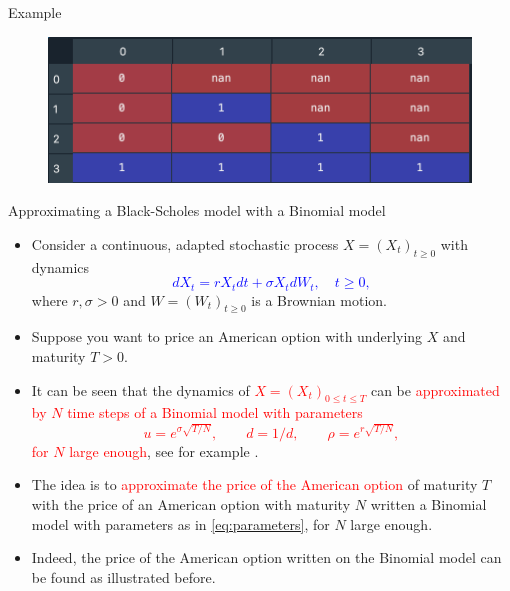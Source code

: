 \documentclass[9 pt]{beamer} %
\def \blue {\textcolor{blue}}
\def \red {\textcolor{red}}
\begin{document}
\begin{frame}{Example}
\begin{figure}
\begin{minipage}[b]{.5\textwidth}
\end{minipage}%
\begin{minipage}[b]{.5\textwidth}
  \centering
 \includegraphics[scale=0.4]{exercise}
\end{minipage}
\end{figure}
\end{frame}

\begin{frame}{Approximating a Black-Scholes model with a Binomial model}
\begin{itemize}
\item Consider a continuous, adapted stochastic process $X=(X_t)_{t \ge 0}$ with dynamics 
\blue{$$
dX_t=r X_t dt + \sigma X_t dW_t, \quad t \ge 0,
$$}
where $r,\sigma>0$ and $W=(W_t)_{t \ge 0}$ is a Brownian motion. 
\item Suppose you want to price an American option with underlying $X$ and maturity $T > 0$.
\item It can be seen that the dynamics of \red{$X=(X_t)_{0 \le t  \le T}$} can be \red{approximated by $N$ time steps of a Binomial model with parameters
\begin{equation}\label{eq:parameters}
u = e^{\sigma \sqrt{T/N}}, \qquad d=1/d, \qquad \rho = e^{r \sqrt{T/N}},
\end{equation}
for $N$ large enough}, see for example .
\item The idea is to \red{approximate the price of the American option} of maturity $T$ with the price of an American option with maturity $N$ written a Binomial model with parameters as in \eqref{eq:parameters}, for $N$ large enough.
\item Indeed, the price of the American option written on the Binomial model can be found as illustrated before.
\end{itemize}
\end{frame}
\end{document}
